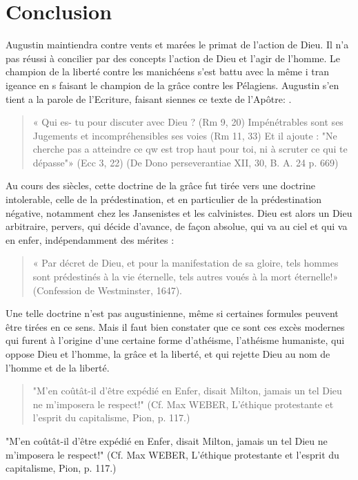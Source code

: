 \section{Conclusion}
\begin{Synthesis}
 Augustin maintiendra contre vents et marées le primat de l'action de Dieu. Il n'a pas réussi à concilier par des concepts l'action de Dieu et l'agir de l'homme. Le champion de la liberté contre les manichéens s'est battu avec la même i tran igeance en s faisant le champion de la grâce contre les Pélagiens. Augustin s'en tient a la parole de l'Ecriture, faisant siennes ce texte de l'Apôtre: .
\begin{quote}
    «  Qui es- tu pour discuter avec Dieu ? (Rm 9, 20)  Impénétrables  sont ses Jugements et incompréhensibles ses voies (Rm 11, 33) Et il ajoute : "Ne cherche pas a atteindre ce qw est trop haut pour toi, ni à scruter ce qui te dépasse"» (Ecc 3, 22) (De Dono perseverantiae XII, 30, B. A. 24 p. 669)
\end{quote}
\end{Synthesis}




Au cours des siècles, cette doctrine de la grâce fut tirée vers une doctrine intolerable, celle de la prédestination, et en particulier de la prédestination négative, notamment chez les Jansenistes et les calvinistes. Dieu est alors un Dieu arbitraire,
pervers, qui décide d'avance, de façon absolue, qui va au ciel et qui va en enfer, indépendamment des mérites :
\begin{quote}
    « Par décret de Dieu, et pour la manifestation de sa gloire, tels hommes sont prédestinés à la vie éternelle, tels autres voués à la mort éternelle!» (Confession de Westminster, 1647).
\end{quote}


Une telle doctrine n'est pas augustinienne, même si certaines formules peuvent être tirées en ce sens. Mais il faut bien constater que ce sont ces excès modernes qui furent à l'origine d'une certaine forme d'athéisme, l'athéisme humaniste, qui oppose Dieu et l'homme, la grâce et la liberté, et qui rejette Dieu au nom de l'homme et de la liberté.
\begin{quote}
    "M'en coûtât-il d'être expédié en Enfer, disait Milton, jamais un tel Dieu ne m'imposera le respect!" (Cf. Max WEBER, L'éthique protestante et l'esprit du capitalisme, Pion, p. 117.)
\end{quote}"M'en coûtât-il d'être expédié en Enfer, disait Milton, jamais un tel Dieu ne m'imposera le respect!" (Cf. Max WEBER, L'éthique protestante et l'esprit du capitalisme, Pion, p. 117.)

